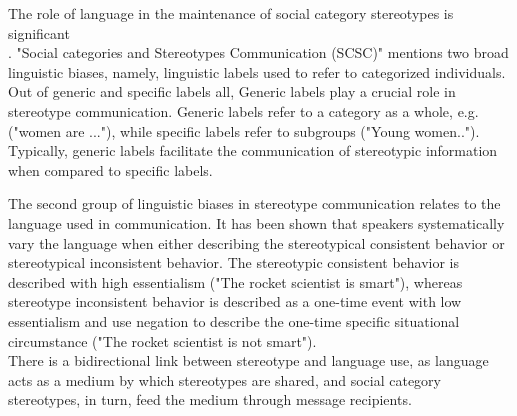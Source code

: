 The role of language in the maintenance of social category stereotypes is significant 
\\
\cite{burgers2020language}.
 "Social categories and Stereotypes Communication (SCSC)" 
 \cite{beukeboom2019stereotypes} mentions two broad linguistic biases, namely, linguistic labels used to refer to categorized individuals. Out of generic and specific labels all, Generic labels play a crucial role in stereotype communication\cite{burgers2020language}. Generic labels refer to a category as a whole, e.g.("women are ..."), while specific labels refer to subgroups ("Young women.."). Typically, generic labels facilitate the communication of stereotypic information when compared to specific labels\cite{burgers2020language}. 
 
 The second group of linguistic biases in stereotype communication relates to the language used in communication\cite{beukeboom2019stereotypes}. It has been shown that speakers systematically vary the language when either describing the stereotypical consistent behavior or stereotypical inconsistent behavior. The stereotypic consistent behavior is described with high essentialism  ("The rocket scientist is smart"), whereas stereotype inconsistent behavior is described as a one-time event with low essentialism and use negation to describe the one-time specific situational circumstance ("The rocket scientist is not smart")\cite{burgers2020language}.  
 \\
There is a bidirectional link between stereotype and language use, as language acts as a medium by which stereotypes are shared, and social category stereotypes, in turn, feed the medium through message recipients\cite{burgers2020language}. 

